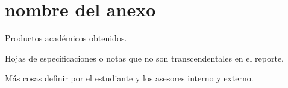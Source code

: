 \chapter{nombre del anexo}


Productos acad\'emicos obtenidos.

Hojas de especificaciones o notas que no son transcendentales en el reporte.

M\'as cosas definir por el estudiante y los asesores interno y externo.


\sigpag
